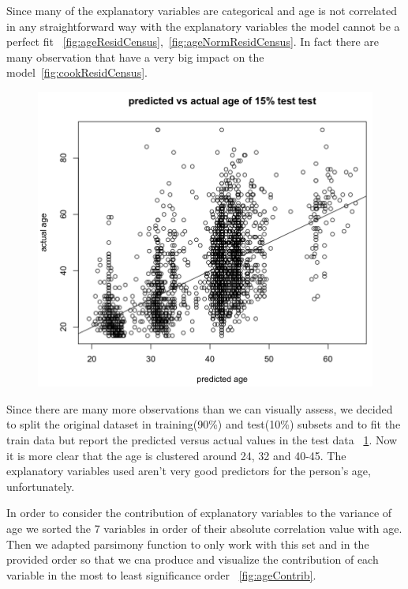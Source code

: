 \documentclass[letter]{article}
\begin{document}
Since many of the explanatory variables are categorical and age is not correlated in any straightforward way with the explanatory variables the model cannot be a perfect fit ~\ref{fig:ageResidCensus},~\ref{fig:ageNormResidCensus}. In fact there are many observation that have a very big impact on the model~\ref{fig:cookResidCensus}.

\begin{figure}
\includegraphics[scale=0.5]{figures/predVsActualCensus.png}
\caption{}
 \label{fig:predVsActualCensus}
\end{figure}

Since there are many more observations than we can visually assess, we decided to split the original dataset in training(90\%) and test(10\%) subsets and to fit the train data but report the predicted versus actual values in the test data ~\ref{fig:predVsActualCensus}. Now it is more clear that the age is clustered around 24, 32 and 40-45. The explanatory variables used aren't very good predictors for the person's age, unfortunately.

In order to consider the contribution of explanatory variables to the variance of age we sorted the 7 variables in order of their absolute correlation value with age. Then we adapted parsimony function to only work with this set and in the provided order so that we cna produce and visualize the contribution of each variable in the most to least significance order  ~\ref{fig:ageContrib}.
\end{document}
